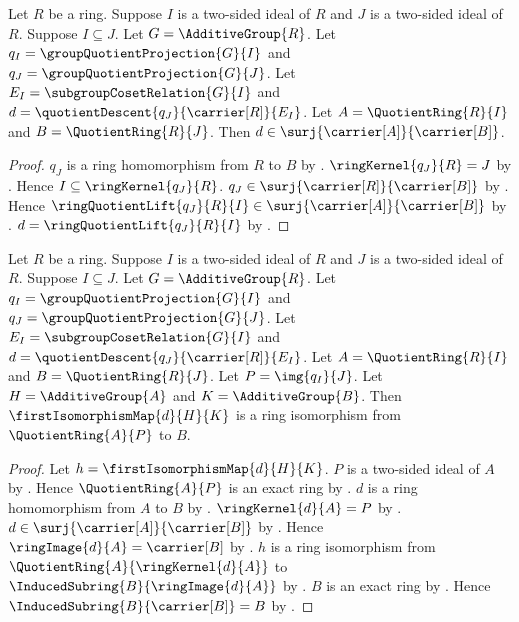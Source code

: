 \begin{theorem}\label{ring_quotient_comparison_surjective}
    Let $R$ be a ring.
    Suppose $I$ is a two-sided ideal of $R$ and
        $J$ is a two-sided ideal of $R$.
    Suppose $I\subseteq J$.
    Let $G=\AdditiveGroup{R}$.
    Let $q_I=\groupQuotientProjection{G}{I}$ and
        $q_J=\groupQuotientProjection{G}{J}$.
    Let $E_I=\subgroupCosetRelation{G}{I}$ and
        $d=\quotientDescent{q_J}{\carrier[R]}{E_I}$.
    Let $A=\QuotientRing{R}{I}$ and $B=\QuotientRing{R}{J}$.
    Then $d\in\surj{\carrier[A]}{\carrier[B]}$.
\end{theorem}
\begin{proof}
    $q_J$ is a ring homomorphism from $R$ to $B$ by
        .
    $\ringKernel{q_J}{R}=J$ by
        .
    Hence $I\subseteq\ringKernel{q_J}{R}$.
    $q_J\in\surj{\carrier[R]}{\carrier[B]}$ by
        .
    Hence $\ringQuotientLift{q_J}{R}{I}\in
        \surj{\carrier[A]}{\carrier[B]}$ by
        .
    $d=\ringQuotientLift{q_J}{R}{I}$ by
        .
\end{proof}

\begin{theorem}\label{ring_third_isomorphism_theorem}
    Let $R$ be a ring.
    Suppose $I$ is a two-sided ideal of $R$ and
        $J$ is a two-sided ideal of $R$.
    Suppose $I\subseteq J$.
    Let $G=\AdditiveGroup{R}$.
    Let $q_I=\groupQuotientProjection{G}{I}$ and
        $q_J=\groupQuotientProjection{G}{J}$.
    Let $E_I=\subgroupCosetRelation{G}{I}$ and
        $d=\quotientDescent{q_J}{\carrier[R]}{E_I}$.
    Let $A=\QuotientRing{R}{I}$ and $B=\QuotientRing{R}{J}$.
    Let $P=\img{q_I}{J}$.
    Let $H=\AdditiveGroup{A}$ and $K=\AdditiveGroup{B}$.
    Then $\firstIsomorphismMap{d}{H}{K}$ is a ring isomorphism from
        $\QuotientRing{A}{P}$ to $B$.
\end{theorem}
\begin{proof}
    Let $h=\firstIsomorphismMap{d}{H}{K}$.
    $P$ is a two-sided ideal of $A$ by
        .
    Hence $\QuotientRing{A}{P}$ is an exact ring by
        .
    $d$ is a ring homomorphism from $A$ to $B$ by
        .
    $\ringKernel{d}{A}=P$ by
        .
    $d\in\surj{\carrier[A]}{\carrier[B]}$ by
        .
    Hence $\ringImage{d}{A}=\carrier[B]$ by
        .
    $h$ is a ring isomorphism from
        $\QuotientRing{A}{\ringKernel{d}{A}}$ to
        $\InducedSubring{B}{\ringImage{d}{A}}$ by
        .
    $B$ is an exact ring by .
    Hence $\InducedSubring{B}{\carrier[B]}=B$ by
        .
\end{proof}

